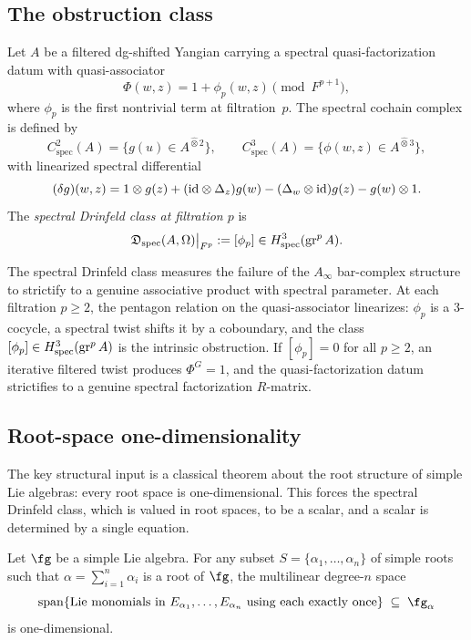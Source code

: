 \subsection{The obstruction class}

\begin{definition}
\label{def:spectral-drinfeld-class-oackd}
Let $A$ be a filtered dg-shifted Yangian carrying a spectral
quasi-factorization datum with quasi-associator
\[
\Phi(w,z)=1+\phi_p(w,z)\pmod{F^{p+1}},
\]
where $\phi_p$ is the first nontrivial term at filtration~$p$.
The spectral cochain complex is defined by
\[
C^2_{\mathrm{spec}}(A)=\{g(u)\in A^{\widehat\otimes 2}\},
\qquad
C^3_{\mathrm{spec}}(A)=\{\phi(w,z)\in A^{\widehat\otimes 3}\},
\]
with linearized spectral differential
\[
(\delta g)(w,z)
=
1\otimes g(z)
+ (\mathrm{id}\otimes \Delta_z)g(w)
- (\Delta_w\otimes \mathrm{id})g(z)
- g(w)\otimes 1.
\]
The \emph{spectral Drinfeld class at filtration $p$} is
\[
\mathfrak D_{\mathrm{spec}}(A,\Omega)\big|_{F^p}
:=[\phi_p]
\in H^3_{\mathrm{spec}}(\operatorname{gr}^p A).
\]
\end{definition}

\begin{remark}[Interpretation]
The spectral Drinfeld class measures the failure of the $A_\infty$
bar-complex structure to strictify to a genuine associative product
with spectral parameter. At each filtration $p\ge 2$, the pentagon
relation on the quasi-associator linearizes: $\phi_p$ is a $3$-cocycle,
a spectral twist shifts it by a coboundary, and the class
$[\phi_p]\in H^3_{\mathrm{spec}}(\operatorname{gr}^p A)$ is the intrinsic
obstruction. If $[\phi_p]=0$ for all $p\ge 2$, an iterative
filtered twist produces $\Phi^G=1$, and the quasi-factorization
datum strictifies to a genuine spectral factorization $R$-matrix.
\end{remark}

\subsection{Root-space one-dimensionality}

The key structural input is a classical theorem about the root
structure of simple Lie algebras: every root space is one-dimensional.
This forces the spectral Drinfeld class, which is valued in root
spaces, to be a scalar, and a scalar is determined by a single
equation.

\begin{theorem}
\label{thm:root-space-one-dim-v1}
Let $\fg$ be a simple Lie algebra. For any subset
$S=\{\alpha_1,\ldots,\alpha_n\}$ of simple roots such that
$\alpha=\sum_{i=1}^n\alpha_i$ is a root of $\fg$, the multilinear
degree-$n$ space
\[
\operatorname{span}\{\textup{Lie monomials in }E_{\alpha_1},\ldots,
E_{\alpha_n}\textup{ using each exactly once}\}\;\subseteq\;\fg_\alpha
\]
is one-dimensional.
\end{theorem}

